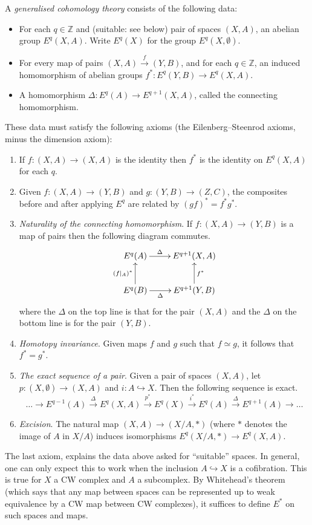 \documentclass[a4paper,10pt]{article}
\theoremstyle{plain}%
\theoremstyle{definition}
\theoremstyle{remark}
\newcommand{\ZZ}{\mathbb{Z}}
\newcommand{\into}{\hookrightarrow}
\newcommand{\xto}[1]{\xrightarrow{#1}}
\begin{document}
A \emph{generalised cohomology theory} consists of the following data:
\begin{itemize}
\item For each $q \in \ZZ$ and (suitable: see below) pair of spaces
  $(X,A)$, an abelian group $E^q(X,A)$. Write $E^q(X)$ for the group
  $E^q(X, \emptyset)$.

\item For every map of pairs $(X,A) \xto{f} (Y,B)$, and for each $q
  \in \ZZ$, an induced homomorphism of abelian groups $f^*: E^q(Y,B)
  \to E^q(X,A)$.

\item A homomorphism $\Delta: E^q(A) \to E^{q+1}(X,A)$, called the
  connecting homomorphism.
\end{itemize}
These data must satisfy the following axioms (the Eilenberg--Steenrod
axioms, minus the dimension axiom):
\begin{enumerate}
\item If $f: (X,A) \to (X,A)$ is the identity then $f^*$ is the
  identity on $E^q(X,A)$ for each $q$.

\item Given $f: (X,A)\to (Y,B)$ and $g: (Y,B)\to (Z,C)$, the
  composites before and after applying $E^q$ are related by $(gf)^* =
  f^*g^*$.

\item \emph{Naturality of the connecting homomorphism}. If $f:
  (X,A)\to (Y,B)$ is a map of pairs then the following diagram
  commutes.
  \begin{equation*}
    \xymatrix{
      E^q(A) \ar[r]^-\Delta & E^{q+1}(X,A)\\
      E^q(B) \ar[r]_-\Delta \ar[u]^{(f|_A)^*} & E^{q+1}(Y,B) \ar[u]_{f^*}
    }
  \end{equation*}
  where the $\Delta$ on the top line is that for the pair $(X,A)$ and
  the $\Delta$ on the bottom line is for the pair $(Y,B)$.

\item \emph{Homotopy invariance}. Given maps $f$ and $g$ such that $f
  \simeq g$, it follows that $f^* = g^*$.

\item \emph{The exact sequence of a pair}. Given a pair of spaces
  $(X,A)$, let $p: (X,\emptyset) \to (X,A)$ and $i: A \into X$. Then
  the following sequence is exact.
  \begin{equation*}
    \dots \to E^{q-1}(A) \xto{\Delta} E^q(X,A) \xto{p^*}
    E^q(X) \xto{i^*} E^q(A) \xto{\Delta} E^{q+1}(A) \to \dots
  \end{equation*}

\item \emph{Excision}. The natural map $(X,A) \to (X/A, *)$ (where $*$
  denotes the image of $A$ in $X/A$) induces isomorphisms $E^q(X/A,*)
  \to E^q(X,A)$.
\end{enumerate}
The last axiom, explains the data above asked for ``suitable''
spaces. In general, one can only expect this to work when the
inclusion $A \into X$ is a cofibration. This is true for $X$ a CW
complex and $A$ a subcomplex. By Whitehead's theorem (which says that
any map between spaces can be represented up to weak equivalence by a
CW map between CW complexes), it suffices to define $E^*$ on such
spaces and maps.
\end{document}
